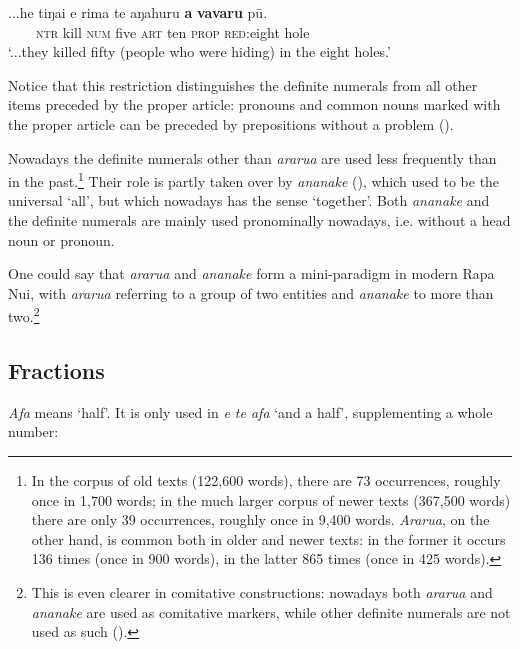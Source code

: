 \ea\label{ex:4.46}
\gll ...he tiŋa{\ꞌ}i e rima te {\ꞌ}aŋahuru \textbf{a} \textbf{vavaru} pū.\\
~~~~\textsc{ntr} kill \textsc{num} five \textsc{art} ten \textsc{prop} \textsc{red}:eight hole\\

\glt
‘...they killed fifty (people who were hiding) in the eight holes.’ \textstyleExampleref{[Mtx-3-01.237]}
\z

Notice that this restriction distinguishes the definite numerals from all other items preceded by the proper article: pronouns and common nouns marked with the proper article can be preceded by prepositions without a problem (). 

Nowadays the definite numerals other than \textit{ararua} are used less frequently than in the past.\footnote{\label{fn:178}In the corpus of old texts (122,600 words), there are 73 occurrences, roughly once in 1,700 words; in the much larger corpus of newer texts (367,500 words) there are only 39 occurrences, roughly once in 9,400 words. \textit{Ararua}, on the other hand, is common both in older and newer texts: in the former it occurs 136 times (once in 900 words), in the latter 865 times (once in 425 words).} Their role is partly taken over by \textit{ananake} (), which used to be the universal  ‘all’, but which nowadays has the sense ‘together’. Both \textit{ananake} and the definite numerals are mainly used pronominally nowadays, i.e. without a head noun or pronoun. 

One could say that \textit{ararua} and \textit{ananake} form a mini-paradigm in modern Rapa Nui, with \textit{ararua} referring to a group of two entities and \textit{ananake} to more than two.\footnote{\label{fn:179}This is even clearer in comitative constructions: nowadays both \textit{ararua} and \textit{ananake} are used as comitative markers, while other definite numerals are not used as such ().} 

\subsection{Fractions}\label{sec:4.3.5}
\textit{{\ꞌ}Afa} means ‘half’. It is only used in \textit{{\ꞌ}e te {\ꞌ}afa} ‘and a half’, supplementing a whole number:

